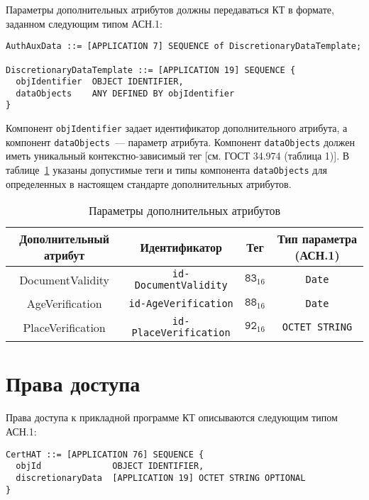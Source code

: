 Параметры дополнительных атрибутов должны передаваться КТ в формате, 
заданном следующим типом АСН.1: 

\begin{verbatim}
AuthAuxData ::= [APPLICATION 7] SEQUENCE of DiscretionaryDataTemplate;

DiscretionaryDataTemplate ::= [APPLICATION 19] SEQUENCE {
  objIdentifier  OBJECT IDENTIFIER,
  dataObjects    ANY DEFINED BY objIdentifier
}
\end{verbatim}

Компонент \verb|objIdentifier| задает идентификатор дополнительного атрибута, 
а компонент \verb|dataObjects|~--– параметр атрибута. 
Компонент \verb|dataObjects| должен иметь уникальный контекстно-зависимый тег 
[см. ГОСТ 34.974 (таблица 1)]. 
В таблице~\ref{Table.DATA.Optional} указаны допустимые теги и типы 
компонента \verb|dataObjects| для определенных в настоящем стандарте 
дополнительных атрибутов.  

\begin{table}[h!]
\caption{Параметры дополнительных атрибутов}\label{Table.DATA.Optional}
\begin{tabular}{|c|c|c|c|}
\hline
Дополнительный атрибут & Идентификатор & Тег & Тип параметра (АСН.1)\\
\hline
\hline
DocumentValidity  &	\verb|id-DocumentValidity| & $\texttt{83}_{16}$ & 
\verb|Date|\\
\hline                                                
AgeVerification	  & \verb|id-AgeVerification| & $\texttt{88}_{16}$ & 
\verb|Date|\\
\hline                                                
PlaceVerification &	\verb|id-PlaceVerification| & $\texttt{92}_{16}$ & 
\verb|OCTET STRING|\\
\hline
\end{tabular}
\end{table}

\section{Права доступа}\label{DATA.Access}

Права доступа к прикладной программе КТ описываются следующим типом АСН.1: 

\begin{verbatim}
CertHAT ::= [APPLICATION 76] SEQUENCE {
  objId              OBJECT IDENTIFIER,
  discretionaryData  [APPLICATION 19] OCTET STRING OPTIONAL
}
\end{verbatim}

